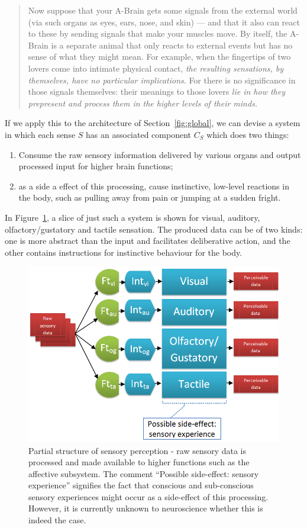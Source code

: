 \documentclass[]{scrartcl}
\theoremstyle{break}
\begin{document}
\begin{quote}
	Now suppose that your A-Brain gets some signals from the external world (via such organs as eyes, ears, nose, and skin) --- and that it also can react to these by sending signals that make your muscles move. By itself, the A-Brain is a separate animal that only reacts to external events but has no sense of what they might mean. For example, when the fingertips of two lovers come into intimate physical contact, {\em the resulting sensations, by themselves, have no particular implications}. For there is no significance in those signals themselves: their meanings to those lovers {\em lie in how they prepresent and process them in the higher levels of their minds.}
\end{quote}

If we apply this to the architecture of Section~\ref{fig:global}, we can devise a system in which each sense $S$ has an associated component $C_S$ which does two things:
\begin{enumerate}
	\item Consume the raw sensory information delivered by various organs and output processed input for higher brain functions;
	\item as a side a effect of this processing, cause  instinctive, low-level reactions in the body, such as pulling away from pain or jumping at a sudden fright.
\end{enumerate}

In Figure~\ref{fig:sensoryPerception}, a slice of just such a system is shown for visual, auditory, olfactory/gustatory and tactile sensation. The produced data can be of two kinds: one is more abstract than the input and facilitates deliberative action, and the other contains instructions for instinctive behaviour for the body.

\begin{figure}[!h]
	\centering
	\includegraphics[width=325pt]{figs/sensoryPerception.png}
	\caption{Partial structure of sensory perception - raw sensory data is processed and made available to higher functions such as the affective subsystem. The comment ``Possible side-effect: sensory experience'' signifies the fact that conscious and sub-conscious sensory experiences might occur as a side-effect of this processing. However, it is currently unknown to neuroscience whether this is indeed the case.}
	\label{fig:sensoryPerception}
\end{figure}
\end{document}
